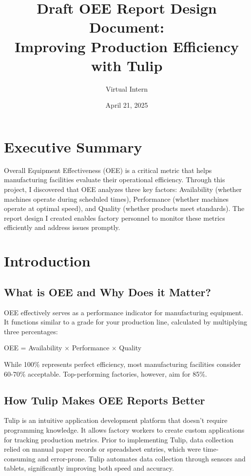 \documentclass{article}
\title{Draft OEE Report Design Document: \\
Improving Production Efficiency with Tulip}
\author{Virtual Intern}
\date{April 21, 2025}
\begin{document}
\maketitle

\section*{Executive Summary}
Overall Equipment Effectiveness (OEE) is a critical metric that helps manufacturing facilities evaluate their operational efficiency. Through this project, I discovered that OEE analyzes three key factors: Availability (whether machines operate during scheduled times), Performance (whether machines operate at optimal speed), and Quality (whether products meet standards). The report design I created enables factory personnel to monitor these metrics efficiently and address issues promptly.

\section{Introduction}

\subsection{What is OEE and Why Does it Matter?}
OEE effectively serves as a performance indicator for manufacturing equipment. It functions similar to a grade for your production line, calculated by multiplying three percentages:

\begin{center}
OEE = Availability × Performance × Quality
\end{center}

While 100\% represents perfect efficiency, most manufacturing facilities consider 60-70\% acceptable. Top-performing factories, however, aim for 85\%.

\subsection{How Tulip Makes OEE Reports Better}
Tulip is an intuitive application development platform that doesn't require programming knowledge. It allows factory workers to create custom applications for tracking production metrics. Prior to implementing Tulip, data collection relied on manual paper records or spreadsheet entries, which were time-consuming and error-prone. Tulip automates data collection through sensors and tablets, significantly improving both speed and accuracy.
\end{document}

